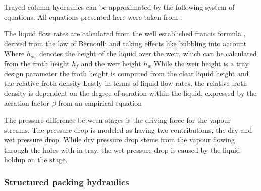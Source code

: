         Trayed column hydraulics can be approximated by the following system of equations.
        All equations presented here were taken from \cite{Lockett.2009}.

        The liquid flow rates are calculated from the well established francis formula ,
        derived from the law of Bernoulli and taking effects like bubbling into account
        Where $h_{ow}$ denotes the height of the liquid over the weir, which can be calculated from the
        froth height $h_f$ and the weir height $h_w$
        While the weir height is a tray design parameter the froth height is computed from the clear
        liquid height and the relative froth density
        Lastly in terms of liquid flow rates, the relative froth density is dependent on the
        degree of aeration within the liquid, expressed by the aeration factor $\beta$
        from an empirical equation

        The pressure difference between stages is the driving force for the vapour streams. The pressure drop
        is modeled as having two contributions, the dry and wet pressure drop. While dry pressure drop
        stems from the vapour flowing through the holes with in tray, the wet pressure drop is caused by the liquid
        holdup on the stage.

    \subsubsection{Structured packing hydraulics}
    \label{sec:mathpro:dynamic:strpackhyd}
%            

